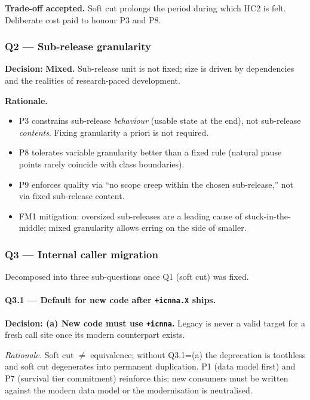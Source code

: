 \documentclass[11pt,a4paper]{article}
\begin{document}
\textbf{Trade-off accepted.} Soft cut prolongs the period during which HC2 is felt. Deliberate cost paid to honour P3 and P8.

\subsubsection{Q2 --- Sub-release granularity}

\textbf{Decision:} \textbf{Mixed.} Sub-release unit is not fixed; size is driven by dependencies and the realities of research-paced development.

\textbf{Rationale.}
\begin{itemize}
    \item P3 constrains sub-release \emph{behaviour} (usable state at the end), not sub-release \emph{contents}. Fixing granularity a priori is not required.
    \item P8 tolerates variable granularity better than a fixed rule (natural pause points rarely coincide with class boundaries).
    \item P9 enforces quality via ``no scope creep within the chosen sub-release,'' not via fixed sub-release content.
    \item FM1 mitigation: oversized sub-releases are a leading cause of stuck-in-the-middle; mixed granularity allows erring on the side of smaller.
\end{itemize}

\subsubsection{Q3 --- Internal caller migration}

Decomposed into three sub-questions once Q1 (soft cut) was fixed.

\paragraph{Q3.1 --- Default for new code after \texttt{+icnna.X} ships.}
\textbf{Decision: (a) New code must use \texttt{+icnna}.} Legacy is never a valid target for a fresh call site once its modern counterpart exists.

\textit{Rationale.} Soft cut $\neq$ equivalence; without Q3.1=(a) the deprecation is toothless and soft cut degenerates into permanent duplication. P1 (data model first) and P7 (survival tier commitment) reinforce this: new consumers must be written against the modern data model or the modernisation is neutralised.
\end{document}

